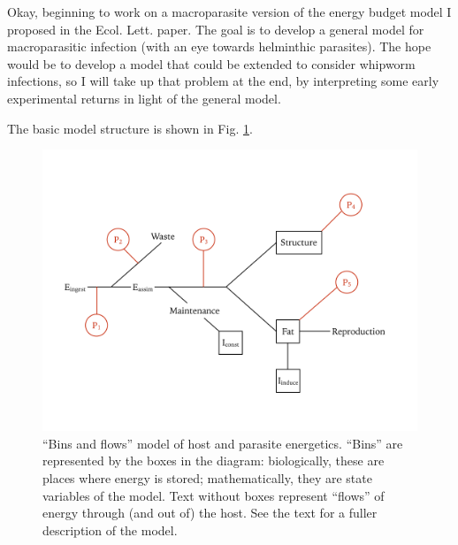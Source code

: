 \documentclass[11pt,reqno,final,pdftex]{amsart}\usepackage[]{graphicx}\usepackage[]{color}
\theoremstyle{plain}
\numberwithin{equation}{part}
\begin{document}
Okay, beginning to work on a macroparasite version of the energy budget model I proposed in the Ecol. Lett. paper.
The goal is to develop a general model for macroparasitic infection (with an eye towards helminthic parasites).
The hope would be to develop a model that could be extended to consider whipworm infections, so I will take up that problem at the end, by interpreting some early experimental returns in light of the general model.

The basic model structure is shown in Fig. \ref{fig:DEB_diagram}.
\begin{figure}
\includegraphics[width=\textwidth]{Macroparasite_DEB.png}
\caption{``Bins and flows'' model of host and parasite energetics. ``Bins'' are represented by the boxes in the diagram: biologically, these are places where energy is stored; mathematically, they are state variables of the model. Text without boxes represent ``flows'' of energy through (and out of) the host. See the text for a fuller description of the model.}
\label{fig:DEB_diagram}
\end{figure}
\end{document}
